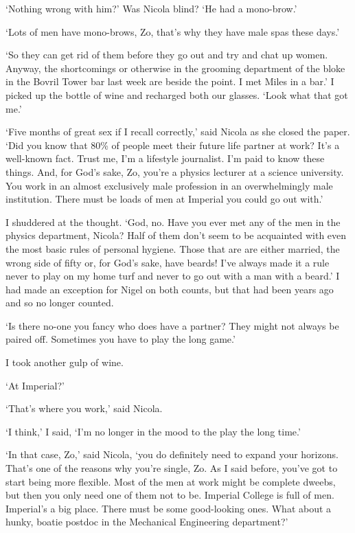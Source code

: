 `Nothing wrong with him?' Was Nicola blind? `He had a mono-brow.'

`Lots of men have mono-brows, Zo, that's why they have male
spas these days.'

`So they can get rid of them before they go out and try and chat up women. Anyway,
the shortcomings or otherwise in the grooming department of the
bloke in the Bovril Tower bar last week are beside the point. I met
Miles in a bar.' I picked up the bottle of wine and recharged both
our glasses. `Look what that got me.'

`Five months of great sex if I recall correctly,' said Nicola as
she closed the paper. `Did you know that 80\% of people meet their
future life partner at work? It's a well-known fact. Trust me, I'm a lifestyle journalist. I'm paid to know these things. And, for God's sake,
Zo, you're a physics lecturer at a science university. You work in an almost
exclusively male profession in an overwhelmingly male institution. There must be {\twelvesl loads\/} of
men at Imperial you could go out with.'

I shuddered at the thought. `God, no. Have you ever met any of the men in the physics department, Nicola? Half of them don't seem to be acquainted with even
the most {\twelveit basic\/} rules of personal hygiene. Those that
are are either married, the wrong side of fifty or, for God's sake,
have beards! I've always made it a rule never to play on my home turf and
never to go out with a man with a beard.' I had made an exception for
Nigel on both counts, but that had been years ago and so no longer
counted.

`Is there no-one you fancy who does have a partner? They might not always be paired off. Sometimes you have to play the long game.'

I took another gulp of wine.

`At Imperial?'

`That's where you work,' said Nicola.

`I think,' I said, `I'm no longer in the mood to the play the long time.'

`In that case, Zo,' said Nicola, `you do definitely need to expand your horizons. That's one of the reasons why you're single, Zo. As I said before,
you've got to start being more flexible. Most of the men at work
might be complete dweebs, but then you only need {\twelveit one} of
them not to be. Imperial College is full of men. Imperial's a big place. There must be
{\twelveit some\/} good-looking ones. What about a hunky, boatie postdoc in the Mechanical Engineering department?'

